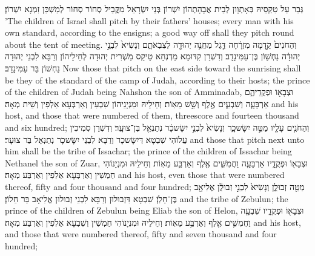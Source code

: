 {גְּבַר עַל טִקְסֵיהּ בְּאָתְוָון לְבֵית אֲבָהָתְהוֹן יִשְׁרוֹן בְּנֵי יִשְׂרָאֵל מִקֳּבֵיל סְחוֹר סְחוֹר לְמַשְׁכַּן זִמְנָא יִשְׁרוֹן׃}
{’The children of Israel shall pitch by their fathers’ houses; every man with his own standard, according to the ensigns; a good way off shall they pitch round about the tent of meeting.}{}
{וְהַחֹנִים֙ קֵ֣דְמָה מִזְרָ֔חָה דֶּ֛גֶל מַחֲנֵ֥ה יְהוּדָ֖ה לְצִבְאֹתָ֑ם וְנָשִׂיא֙ לִבְנֵ֣י יְהוּדָ֔ה נַחְשׁ֖וֹן בֶּן־עַמִּינָדָֽב׃
}
{וְדִשְׁרַן קִדּוּמָא מַדְנְחָא טֵיקַס מַשְׁרִית יְהוּדָה לְחֵילֵיהוֹן וְרַבָּא לִבְנֵי יְהוּדָה נַחְשׁוֹן בַּר עַמִּינָדָב׃}
{Now those that pitch on the east side toward the sunrising shall be they of the standard of the camp of Judah, according to their hosts; the prince of the children of Judah being Nahshon the son of Amminadab,}{}
{וּצְבָא֖וֹ וּפְקֻדֵיהֶ֑ם אַרְבָּעָ֧ה וְשִׁבְעִ֛ים אֶ֖לֶף וְשֵׁ֥שׁ מֵאֽוֹת׃}
{וְחֵילֵיהּ וּמִנְיָנֵיהוֹן שִׁבְעִין וְאַרְבְּעָא אַלְפִין וְשֵׁית מְאָה׃}
{and his host, and those that were numbered of them, threescore and fourteen thousand and six hundred;}{}
{וְהַחֹנִ֥ים עָלָ֖יו מַטֵּ֣ה יִשָּׂשכָ֑ר וְנָשִׂיא֙ לִבְנֵ֣י יִשָּׂשכָ֔ר נְתַנְאֵ֖ל בֶּן־צוּעָֽר׃}
{וְדִשְׁרַן סְמִיכִין עֲלוֹהִי שִׁבְטָא דְּיִשָּׂשכָר וְרַבָּא לִבְנֵי יִשָּׂשכָר נְתַנְאֵל בַּר צוּעָר׃}
{and those that pitch next unto him shall be the tribe of Issachar; the prince of the children of Issachar being Nethanel the son of Zuar,}{}
{וּצְבָא֖וֹ וּפְקֻדָ֑יו אַרְבָּעָ֧ה וַחֲמִשִּׁ֛ים אֶ֖לֶף וְאַרְבַּ֥ע מֵאֽוֹת׃}
{וְחֵילֵיהּ וּמִנְיָנוֹהִי חַמְשִׁין וְאַרְבְּעָא אַלְפִין וְאַרְבַּע מְאָה׃}
{and his host, even those that were numbered thereof, fifty and four thousand and four hundred;}{}
{מַטֵּ֖ה זְבוּלֻ֑ן וְנָשִׂיא֙ לִבְנֵ֣י זְבוּלֻ֔ן אֱלִיאָ֖ב בֶּן־חֵלֹֽן׃}
{שִׁבְטָא דִּזְבוּלוּן וְרַבָּא לִבְנֵי זְבוּלוּן אֱלִיאָב בַּר חֵלוֹן׃}
{and the tribe of Zebulun; the prince of the children of Zebulun being Eliab the son of Helon,}{}
{וּצְבָא֖וֹ וּפְקֻדָ֑יו שִׁבְעָ֧ה וַחֲמִשִּׁ֛ים אֶ֖לֶף וְאַרְבַּ֥ע מֵאֽוֹת׃}
{וְחֵילֵיהּ וּמִנְיָנוֹהִי חַמְשִׁין וְשִׁבְעָא אַלְפִין וְאַרְבַּע מְאָה׃}
{and his host, and those that were numbered thereof, fifty and seven thousand and four hundred;}{}

